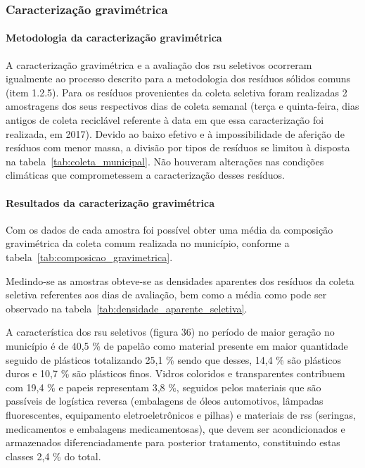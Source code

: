 	\subsubsection{Caracterização gravimétrica}
	
	\paragraph{\textbf{Metodologia da caracterização gravimétrica}}
	
	A caracterização gravimétrica e a avaliação dos \gls{rsu} seletivos ocorreram igualmente ao processo descrito para a metodologia dos resíduos sólidos comuns (item 1.2.5). Para os resíduos provenientes da coleta seletiva foram realizadas 2 amostragens dos seus respectivos dias de coleta semanal (terça e quinta-feira, dias antigos de coleta reciclável referente à data em que essa caracterização foi realizada, em 2017). Devido ao baixo efetivo e à impossibilidade de aferição de resíduos com menor massa, a divisão por tipos de resíduos se limitou à disposta na tabela~\ref{tab:coleta_municipal}. Não houveram alterações nas condições climáticas que comprometessem a caracterização desses resíduos.
	
	
	
	\paragraph{\textbf{Resultados da caracterização gravimétrica}}
	
	Com os dados de cada amostra foi possível obter uma média da composição gravimétrica da coleta comum realizada no município, conforme a tabela~\ref{tab:composicao_gravimetrica}.
	
	
	
	Medindo-se as amostras obteve-se as densidades aparentes dos resíduos da coleta seletiva referentes aos dias de avaliação, bem como a média como pode ser observado na tabela~\ref{tab:densidade_aparente_seletiva}.
	
	
	
	A característica dos \gls{rsu} seletivos (figura 36) no período de maior geração no município é de 40,5 \% de papelão como material presente em maior quantidade seguido de plásticos totalizando 25,1 \% sendo que desses, 14,4 \% são plásticos duros e 10,7 \% são plásticos finos. Vidros coloridos e transparentes contribuem com 19,4 \% e papeis representam 3,8 \%, seguidos pelos materiais que são passíveis de logística reversa (embalagens de óleos automotivos, lâmpadas fluorescentes, equipamento eletroeletrônicos e pilhas) e materiais de \gls{rss} (seringas, medicamentos e embalagens medicamentosas), que devem ser acondicionados e armazenados diferenciadamente para posterior tratamento, constituindo estas classes 2,4 \% do total. 
	

